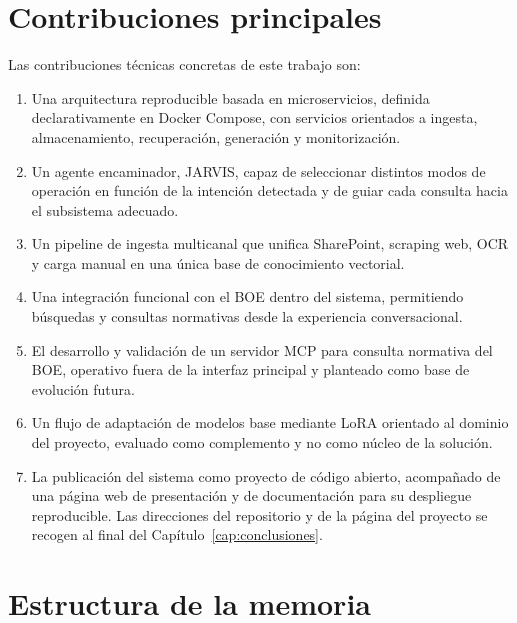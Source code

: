 \section{Contribuciones principales}

Las contribuciones técnicas concretas de este trabajo son:

\begin{enumerate}
    \item Una arquitectura reproducible basada en microservicios, definida declarativamente en Docker Compose, con servicios orientados a ingesta, almacenamiento, recuperación, generación y monitorización.

    \item Un agente encaminador, JARVIS, capaz de seleccionar distintos modos de operación en función de la intención detectada y de guiar cada consulta hacia el subsistema adecuado.

    \item Un pipeline de ingesta multicanal que unifica SharePoint, scraping web, OCR y carga manual en una única base de conocimiento vectorial.

    \item Una integración funcional con el BOE dentro del sistema, permitiendo búsquedas y consultas normativas desde la experiencia conversacional.

    \item El desarrollo y validación de un servidor MCP para consulta normativa del BOE, operativo fuera de la interfaz principal y planteado como base de evolución futura.

    \item Un flujo de adaptación de modelos base mediante LoRA orientado al dominio del proyecto, evaluado como complemento y no como núcleo de la solución.

    \item La publicación del sistema como proyecto de código abierto, acompañado de una página web de presentación y de documentación para su despliegue reproducible. Las direcciones del repositorio y de la página del proyecto se recogen al final del Capítulo~\ref{cap:conclusiones}.
\end{enumerate}

\section{Estructura de la memoria}

